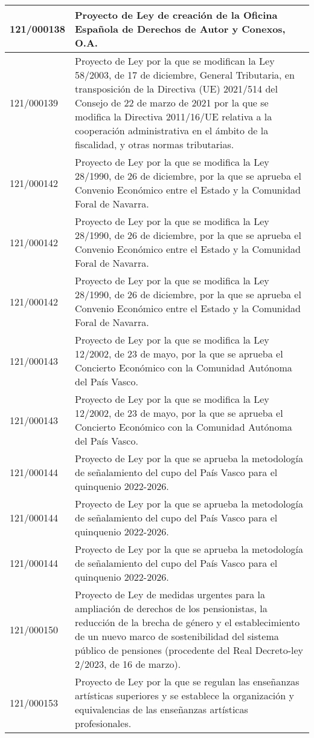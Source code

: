 {\begin{table}[H]
\begin{center}
\begin{tabularx}{\linewidth}{| l | X |}
\hline
121/000138 & Proyecto de Ley de creación de la Oficina Española de Derechos de Autor y Conexos, O.A. \\
\hline
121/000139 & Proyecto de Ley por la que se modifican la Ley 58/2003, de 17 de diciembre, General Tributaria, en transposición de la Directiva (UE) 2021/514 del Consejo de 22 de marzo de 2021 por la que se modifica la Directiva 2011/16/UE relativa a la cooperación administrativa en el ámbito de la fiscalidad, y otras normas tributarias. \\
\hline
121/000142 & Proyecto de Ley por la que se modifica la Ley 28/1990, de 26 de diciembre, por la que se aprueba el Convenio Económico entre el Estado y la Comunidad Foral de Navarra. \\
\hline
121/000142 & Proyecto de Ley por la que se modifica la Ley 28/1990, de 26 de diciembre, por la que se aprueba el Convenio Económico entre el Estado y la Comunidad Foral de Navarra. \\
\hline
121/000142 & Proyecto de Ley por la que se modifica la Ley 28/1990, de 26 de diciembre, por la que se aprueba el Convenio Económico entre el Estado y la Comunidad Foral de Navarra. \\
\hline
121/000143 & Proyecto de Ley por la que se modifica la Ley 12/2002, de 23 de mayo, por la que se aprueba el Concierto Económico con la Comunidad Autónoma del País Vasco. \\
\hline
121/000143 & Proyecto de Ley por la que se modifica la Ley 12/2002, de 23 de mayo, por la que se aprueba el Concierto Económico con la Comunidad Autónoma del País Vasco. \\
\hline
121/000144 & Proyecto de Ley por la que se aprueba la metodología de señalamiento del cupo del País Vasco para el quinquenio 2022-2026. \\
\hline
121/000144 & Proyecto de Ley por la que se aprueba la metodología de señalamiento del cupo del País Vasco para el quinquenio 2022-2026. \\
\hline
121/000144 & Proyecto de Ley por la que se aprueba la metodología de señalamiento del cupo del País Vasco para el quinquenio 2022-2026. \\
\hline
121/000150 & Proyecto de Ley de medidas urgentes para la ampliación de derechos de los pensionistas, la reducción de la brecha de género y el establecimiento de un nuevo marco de sostenibilidad del sistema público de pensiones (procedente del Real Decreto-ley 2/2023, de 16 de marzo). \\
\hline
121/000153 & Proyecto de Ley por la que se regulan las enseñanzas artísticas superiores y se establece la organización y equivalencias de las enseñanzas artísticas profesionales. \\

\end{tabularx}
\end{center}
\end{table}}
